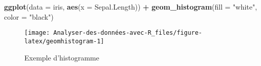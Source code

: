 \documentclass[
  french,
]{book}
\newenvironment{Shaded}{\begin{snugshade}}{\end{snugshade}}
\newcommand{\DataTypeTok}[1]{\textcolor[rgb]{0.13,0.29,0.53}{#1}}
\newcommand{\KeywordTok}[1]{\textcolor[rgb]{0.13,0.29,0.53}{\textbf{#1}}}
\newcommand{\NormalTok}[1]{#1}
\newcommand{\OperatorTok}[1]{\textcolor[rgb]{0.81,0.36,0.00}{\textbf{#1}}}
\newcommand{\StringTok}[1]{\textcolor[rgb]{0.31,0.60,0.02}{#1}}
\begin{document}
\begin{Shaded}
\begin{Highlighting}[]
\KeywordTok{ggplot}\NormalTok{(}\DataTypeTok{data =}\NormalTok{ iris, }\KeywordTok{aes}\NormalTok{(}\DataTypeTok{x =}\NormalTok{ Sepal.Length)) }\OperatorTok{+}\StringTok{ }
\StringTok{  }\KeywordTok{geom_histogram}\NormalTok{(}\DataTypeTok{fill =} \StringTok{"white"}\NormalTok{, }\DataTypeTok{color =} \StringTok{"black"}\NormalTok{)}
\end{Highlighting}
\end{Shaded}

\begin{figure}

{\centering \texttt{[image: Analyser-des-données-avec-R\_files/figure-latex/geomhistogram-1]} 

}

\caption{Exemple d'histogramme}\label{fig:geomhistogram}
\end{figure}
\end{document}
